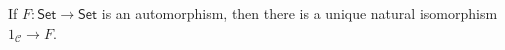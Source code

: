 If $F\colon \mathsf{Set}\to \mathsf{Set}$ is an automorphism, then there is
a unique natural isomorphism $1_{\mathcal{C}}\to F$.
